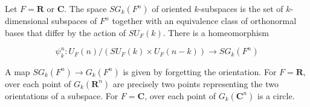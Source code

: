 Let $F = \mathbf{R}$ or $\mathbf{C}$. The space $SG_k(F^n)$ of oriented $k$-subspaces is the set of $k$-dimensional subspaces of $F^n$ together with an equivalence class of orthonormal bases that differ by the action of $SU_F(k)$. There is a homeomorphism

$$\psi_k^n: U_F(n)/(SU_F(k) \times U_F(n-k)) \to SG_k(F^n)$$

A map $SG_k(F^n) \to G_k(F^n)$ is given by forgetting the orientation. For $F=\mathbf{R}$, over each point of $G_k(\mathbf{R}^n)$ are precisely two points representing the two orientations of a subspace. For $F=\mathbf{C}$, over each point of $G_k(\mathbf{C}^n)$ is a circle.
